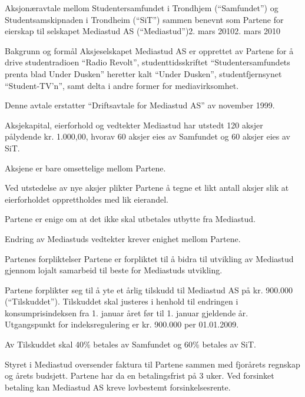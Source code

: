 \begin{instruks}{Aksjonæravtale mellom Studentersamfundet i Trondhjem
(``Samfundet'') og
Studentsamskipnaden i Trondheim (``SiT'') sammen benevnt som Partene for
eierskap til selskapet Mediastud AS (``Mediastud'')}{2. mars 2010}{2. mars 2010}

	\begin{instruksledd}{Bakgrunn og formål }
Aksjeselskapet Mediastud AS er opprettet av Partene for å drive studentradioen
``Radio Revolt'', studenttidsskriftet ``Studentersamfundets prenta blad Under
Dusken'' heretter kalt ``Under Dusken'', studentfjernsynet ``Student-TV’n'', samt
delta i andre former for mediavirksomhet.

Denne avtale erstatter ``Driftsavtale for Mediastud AS'' av november 1999.
	\end{instruksledd}

	\begin{instruksledd}{Aksjekapital, eierforhold og vedtekter}
	Mediastud har utstedt 120 aksjer pålydende kr. 1.000,00, hvorav 60
	aksjer eies av Samfundet og 60 aksjer eies av SiT.
	
	Aksjene er bare omsettelige mellom Partene.

	Ved utstedelse av nye aksjer plikter Partene å tegne et likt antall
	aksjer slik at eierforholdet opprettholdes med lik eierandel. 
	
	Partene er enige om at det ikke skal utbetales utbytte fra Mediastud.
	
	Endring av Mediastuds vedtekter krever enighet mellom Partene. 
	\end{instruksledd}

	\begin{instruksledd}{Partenes forpliktelser}
	Partene er forpliktet til å bidra til utvikling av Mediastud gjennom
	lojalt samarbeid til beste for Mediastuds utvikling. 

	Partene forplikter seg til å yte et årlig tilskudd til Mediastud AS på
	kr. 900.000 (``Tilskuddet''). Tilskuddet skal justeres i henhold til
	endringen i konsumprisindeksen fra 1. januar året før til 1. januar
	gjeldende år. Utgangspunkt for indeksregulering er kr. 900.000 per
	01.01.2009.

	Av Tilskuddet skal 40\% betales av Samfundet og 60\% betales av SiT. 
	
	Styret i Mediastud oversender faktura til Partene sammen med fjorårets
	regnskap og årets budsjett. Partene har da en betalingsfrist på 3 uker.
	Ved forsinket betaling kan Mediastud AS kreve lovbestemt
	forsinkelsesrente. 


\end{instruksledd}
\end{instruks}
